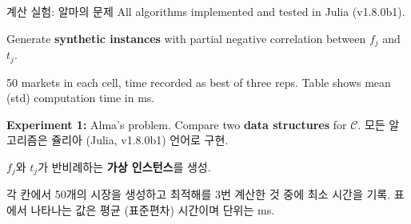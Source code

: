 \documentclass[10pt,slidestop,compress,mathserif,notheorems]{beamer}
\newif\ifen
\theoremstyle{definition}
\theoremstyle{definition}
\begin{document}
\begin{frame}{\ifen Computational experiment: Alma's problem \else 계산 실험: 알마의 문제\fi}
\ifen 
All algorithms implemented and tested in Julia (v1.8.0b1). 

Generate \textbf{synthetic instances} with partial negative correlation between $f_j$ and $t_j$. 
 
50 markets in each cell, time recorded as best of three reps. Table shows mean (std) computation time in ms.

\textbf{Experiment 1:} Alma's problem. Compare two \textbf{data structures} for $\mathcal{C}$. 
\else
모든 알고리즘은 쥴리아 (Julia, v1.8.0b1) 언어로 구현.

$f_j$와 $t_j$가 반비례하는 \textbf{가상 인스턴스}를 생성.

각 칸에서 50개의 시장을 생성하고 최적해를 3번 계산한 것 중에 최소 시간을 기록. 표에서 나타나는 값은 평균 (표준편차) 시간이며 단위는 ms.


\end{frame}
\end{document}
